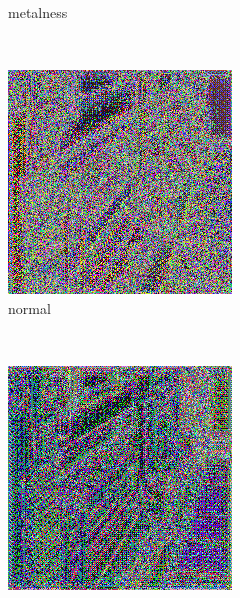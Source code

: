 \begin{figure}[h!]
\begin{subfigure}[b]{0.175\textwidth}
     \caption{metalness}
    \end{subfigure}
    \\ \vspace{0.2cm}
    \begin{subfigure}[b]{0.175\textwidth}
     \includegraphics[width=\textwidth]{figures/result/single/normal/1.png}
     \caption{normal}
    \end{subfigure}
    ~
    \begin{subfigure}[b]{0.175\textwidth}
     \includegraphics[width=\textwidth]{figures/result/single/position/1.png}

\end{subfigure}
\end{figure}
